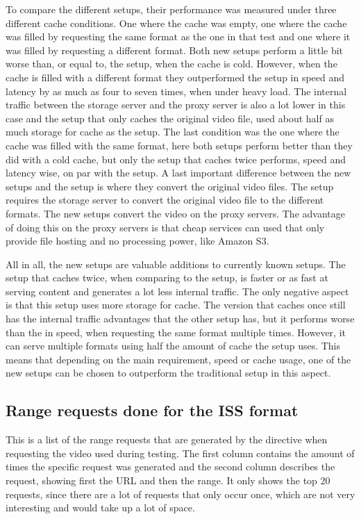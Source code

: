 \documentclass[twoside,openright]{uva-bachelor-thesis}
\begin{document}
To compare the different setups, their performance was measured under three
different cache conditions. One where the cache was empty, one where the cache
was filled by requesting the same format as the one in that test and one where
it was filled by requesting a different format. Both new setups perform a little
bit worse than, or equal to, the \cdn setup, when the cache is cold.  However, when
the cache is filled with a different format they outperformed the \cdn setup in
speed and latency by as much as four to seven times, when under heavy load. The
internal traffic between the storage server and the proxy server is also a lot
lower in this case and the setup that only caches the original video file, used
about half as much storage for cache as the \cdn setup. The last
condition was the one where the cache was filled with the same format, here both
setups perform better than they did with a cold cache, but only the setup that
caches twice performs, speed and latency wise, on par with the \cdn setup. A
last important difference between the new setups and the \cdn setup is where
they convert the original video files. The \cdn setup requires the storage
server to convert the original video file to the different formats. The new
setups convert the video on the proxy servers. The advantage of doing this on
the proxy servers is that cheap services can used that only provide file hosting
and no processing power, like Amazon S3.

All in all, the new setups are valuable additions to currently known setups. The
setup that caches twice, when comparing to the \cdn setup, is faster or as
fast at serving content and generates a lot less internal traffic. The only
negative aspect is that this setup uses more storage for cache. The version that
caches once still has the internal traffic advantages that the other setup has,
but it performs worse than the \cdn in speed, when requesting the same format
multiple times. However, it can serve multiple formats using half the amount of
cache the \cdn setup uses. This means that depending on the main requirement,
speed or cache usage, one of the new setups can be chosen to outperform the
traditional \cdn setup in this aspect.






\printbibliography[heading=bibintoc]{}

\printglossaries{}
\begin{appendices}
    \chapter{Range requests done for the ISS format}\label{ap:log}
    This is a list of the range requests that are generated by the \ipplong
    directive when requesting the video used during testing. The first column
    contains the amount of times the specific request was generated and the
    second column describes the request, showing first the URL and then the
    range. It only shows the top 20 requests, since there are a lot of requests
    that only occur once, which are not very interesting and would take up a lot
    of space.
\end{appendices}
\end{document}
